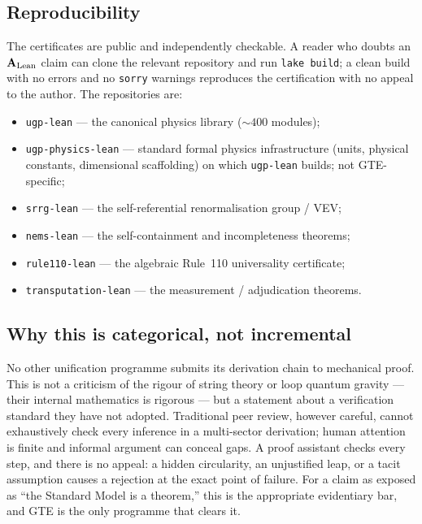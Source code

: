 \documentclass[11pt]{article}
\newcommand{\CatAL}{\ensuremath{\textbf{A}_{\rm Lean}}}
\begin{document}
\subsection{Reproducibility}

The certificates are public and independently checkable.  A reader who doubts an
\CatAL{} claim can clone the relevant repository and run \texttt{lake build}; a
clean build with no errors and no \texttt{sorry} warnings reproduces the
certification with no appeal to the author.  The repositories are:
\begin{itemize}[leftmargin=1.5em,itemsep=1pt,topsep=2pt]
\item \texttt{ugp-lean} --- the canonical physics library ($\sim\!400$ modules);
\item \texttt{ugp-physics-lean} --- standard formal physics infrastructure (units,
  physical constants, dimensional scaffolding) on which \texttt{ugp-lean} builds;
  not GTE-specific;
\item \texttt{srrg-lean} --- the self-referential renormalisation group / VEV;
\item \texttt{nems-lean} --- the self-containment and incompleteness theorems;
\item \texttt{rule110-lean} --- the algebraic Rule~110 universality certificate;
\item \texttt{transputation-lean} --- the measurement / adjudication theorems.
\end{itemize}

\subsection{Why this is categorical, not incremental}

No other unification programme submits its derivation chain to mechanical proof.
This is not a criticism of the rigour of string theory or loop quantum gravity ---
their internal mathematics is rigorous --- but a statement about a verification
standard they have not adopted.  Traditional peer review, however careful, cannot
exhaustively check every inference in a multi-sector derivation; human attention is
finite and informal argument can conceal gaps.  A proof assistant checks every
step, and there is no appeal: a hidden circularity, an unjustified leap, or a tacit
assumption causes a rejection at the exact point of failure.  For a claim as
exposed as ``the Standard Model is a theorem,'' this is the appropriate evidentiary
bar, and GTE is the only programme that clears it.
\end{document}
